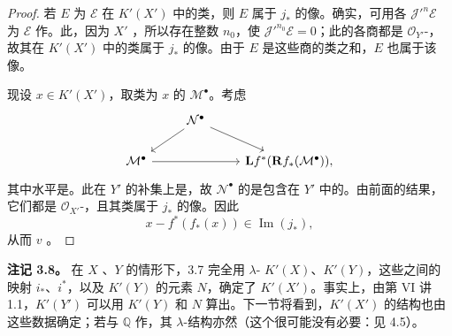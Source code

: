 \begin{proof}
若 $E$ 为 $\mathcal E$ 在 $K'(X')$ 中的类，则 $E$ 属于 $j_*$ 的像。确实，可用各 $\mathcal J'^n\mathcal E$ 为 $\mathcal E$ 作。此，因为 $X'$ ，所以存在整数 $n_0$，使 $\mathcal J'^{n_0}\mathcal E=0$；此的各商都是 $\mathcal O_{Y'}$-，故其在 $K'(X')$ 中的类属于 $j_*$ 的像。由于 $E$ 是这些商的类之和，$E$ 也属于该像。

现设 $x\in K'(X')$，取类为 $x$ 的 $\mathcal M^\bullet$。考虑
\[
\begin{tikzcd}
&\mathcal N^\bullet\arrow[dl]\arrow[dr]&\\
\mathcal M^\bullet\arrow[rr]&&\mathbf Lf^*(\mathbf Rf_*(\mathcal M^\bullet)),
\end{tikzcd}
\]
其中水平是。此在 $Y'$ 的补集上是，故 $\mathcal N^\bullet$ 的是包含在 $Y'$ 中的。由前面的结果，它们都是 $\mathcal O_{X'}$-，且其类属于 $j_*$ 的像。因此
\[
x-f^*(f_*(x))\in\operatorname{Im}(j_*),
\]
从而 $v$ 。
\end{proof}
\textbf{注记 3.8。} 在 $X$ 、$Y$ 的情形下，3.7 完全用 $\lambda$- $K'(X)$、$K'(Y)$，这些之间的映射 $i_*$、$i^*$，以及 $K'(Y)$ 的元素 $N$，确定了 $K'(X')$。事实上，由第 VI 讲 1.1，$K'(Y')$ 可以用 $K'(Y)$ 和 $N$ 算出。下一节将看到，$K'(X')$ 的结构也由这些数据确定；若与 $\mathbb Q$ 作，其 $\lambda$-结构亦然（这个很可能没有必要：见 4.5）。

